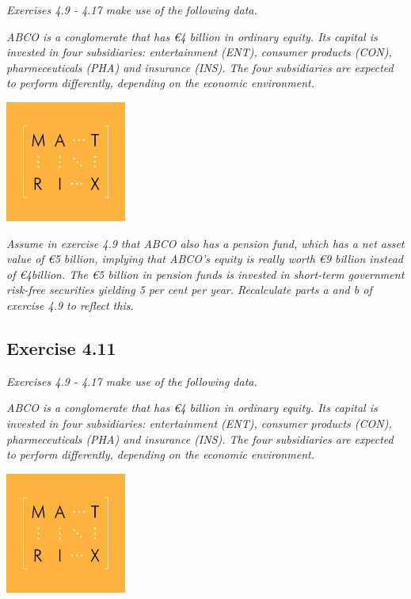 \documentclass[]{book}
\newcommand{\euro}{€}
\theoremstyle{definition}
\theoremstyle{definition}
\theoremstyle{remark}
\begin{document}
\emph{Exercises 4.9 - 4.17 make use of the following data.}
\citep[p.117]{book}

\emph{ABCO is a conglomerate that has \euro{}4 billion in ordinary
equity. Its capital is invested in four subsidiaries: entertainment
(ENT), consumer products (CON), pharmeceuticals (PHA) and insurance
(INS). The four subsidiaries are expected to perform differently,
depending on the economic environment.} \citep[p.117]{book}

\begin{center}\includegraphics[width=150px]{figures/matrix} \end{center}

\emph{Assume in exercise 4.9 that ABCO also has a pension fund, which
has a net asset value of \euro{}5 billion, implying that ABCO's equity
is really worth \euro{}9 billion instead of \euro{}4billion. The
\euro{}5 billion in pension funds is invested in short-term government
risk-free securities yielding 5 per cent per year. Recalculate parts a
and b of exercise 4.9 to reflect this.} \citep[p.118]{book}

\subsection{Exercise 4.11}\label{exercise-4.11}

\emph{Exercises 4.9 - 4.17 make use of the following data.}
\citep[p.117]{book}

\emph{ABCO is a conglomerate that has \euro{}4 billion in ordinary
equity. Its capital is invested in four subsidiaries: entertainment
(ENT), consumer products (CON), pharmeceuticals (PHA) and insurance
(INS). The four subsidiaries are expected to perform differently,
depending on the economic environment.} \citep[p.117]{book}

\begin{center}\includegraphics[width=150px]{figures/matrix} \end{center}
\end{document}
